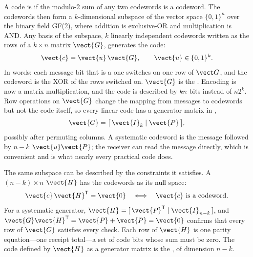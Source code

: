 A code is  if the modulo-2 sum of any two codewords is a codeword. The codewords
then form a $k$-dimensional subspace of the vector space $\{0,1\}^n$ over the binary field
GF(2), where addition is exclusive-OR and multiplication is AND. Any basis of the subspace, $k$
linearly independent codewords written as the rows of a $k\times n$ matrix $\vect{G}$, generates
the code:
\begin{equation}
\vect{c}=\vect{u}\,\vect{G},\qquad \vect{u}\in\{0,1\}^k .
\label{eq:ch14:enc}
\end{equation}
In words: each message bit that is a one switches on one row of $\vect G$, and the codeword is the
XOR of the rows switched on. $\vect{G}$ is the . Encoding is now a matrix
multiplication, and the code is described by $kn$ bits instead of $n2^k$. Row operations on
$\vect{G}$ change the mapping from messages to codewords but not the code itself, so every linear
code has a generator matrix in ,
\begin{equation}
\vect{G}=\big[\,\vect{I}_k \mid \vect{P}\,\big],
\end{equation}
possibly after permuting columns. A systematic codeword is the message followed by $n-k$
 $\vect{u}\vect{P}$; the receiver can read the message directly, which is
convenient and is what nearly every practical code does.

The same subspace can be described by the constraints it satisfies. A $(n-k)\times n$
 $\vect{H}$ has the codewords as its null space:
\begin{equation}
\vect{c}\,\vect{H}^{\mathsf T}=\vect{0}\quad\Longleftrightarrow\quad \vect{c}\ \text{is a codeword}.
\label{eq:ch14:parity}
\end{equation}
For a systematic generator, $\vect{H}=[\,\vect{P}^{\mathsf T}\mid\vect{I}_{n-k}\,]$, and
$\vect{G}\vect{H}^{\mathsf T}=\vect{P}+\vect{P}=\vect{0}$ confirms that every row of $\vect{G}$
satisfies every check. Each row of $\vect{H}$ is one parity equation---one receipt total---a set of
code bits whose sum must be zero. The code defined by $\vect{H}$ as a generator matrix is the
, of dimension $n-k$.


